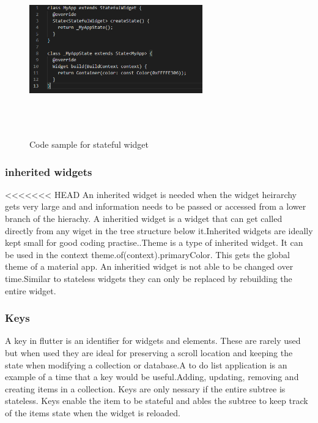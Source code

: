 \begin{figure}[ht!]
    \centering
 \includegraphics[width=75mm, height=75mm,scale=0.5]{img/stateful.PNG}
\caption{Code sample for stateful widget}
\label{fig:stateful}
\end{figure}

\subsubsection{inherited widgets}
<<<<<<< HEAD
An inherited widget is needed when the widget heirarchy gets very large and and information needs to be passed or accessed from a lower branch of the hierachy. A inheritied widget is a widget that can get called directly from any wiget in the tree structure below it.Inherited widgets are ideally kept small for good coding practise.\cite{fidanboylu_2019}.Theme is a type of inherited widget. It can be used in the context theme.of(context).primaryColor. This gets the global theme of a material app. An inheritied widget is not able to be changed over time.Similar to stateless widgets they can only be replaced by rebuilding the entire widget.\cite{inherited_widgets}

\subsubsection{Keys}
A key in flutter is an identifier for widgets and elements. These are rarely used but when used they are ideal for preserving a scroll location and keeping the state when modifying a collection or database.\cite{key_widgets}A to do list application is an example of a time that a key would be useful.Adding, updating, removing and creating items in a collection. Keys are only nessary if the entire subtree is stateless. Keys enable the item to be stateful and ables the subtree to keep track of the items state when the widget is reloaded. \cite{keys}

